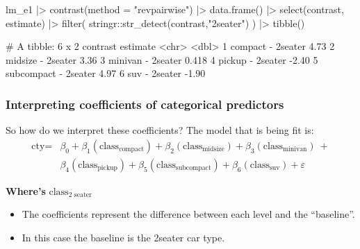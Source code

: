 \documentclass[a4paper]{article}\usepackage[]{graphicx}\usepackage[]{xcolor}
\begin{document}
\hspace{0.02\textwidth}
\begin{minipage}[t]{0.49\textwidth}
\begin{Schunk}
\begin{Sinput}
lm_e1 |> 
  contrast(method = "revpairwise") |> 
  data.frame() |> 
  select(contrast, estimate) |> 
  filter(
    stringr::str_detect(contrast,"2seater")
  ) |> tibble()
\end{Sinput}
\begin{Soutput}
# A tibble: 6 x 2
  contrast             estimate
  <chr>                   <dbl>
1 compact - 2seater       4.73 
2 midsize - 2seater       3.36 
3 minivan - 2seater       0.418
4 pickup - 2seater       -2.40 
5 subcompact - 2seater    4.97 
6 suv - 2seater          -1.90 
\end{Soutput}
\end{Schunk}
\end{minipage}
\subsubsection{Interpreting coefficients of categorical predictors}
So how do we interpret these coefficients? The model that is being fit is:
\begin{align*}
	\text{cty} ={}& \beta_{0} + \beta_{1}(\text{class}_{\text{compact}}) + \beta_{2}(\text{class}_{\text{midsize}}) + \beta_{3}(\text{class}_{\text{minivan}})\ + \\
	& \beta_{4}(\text{class}_{\text{pickup}}) + \beta_{5}(\text{class}_{\text{subcompact}}) + \beta_{6}(\text{class}_{\text{suv}}) + \varepsilon
\end{align*}
\begin{greenbox}
	\textbf{Where's} \( \text{class}_{\text{2 seater}} \) 
\end{greenbox}
\begin{itemize}
	\item The coefficients represent the difference between each level and the ``baseline''.
	\item In this case the baseline is the 2seater car type.
\end{itemize}
\end{document}
